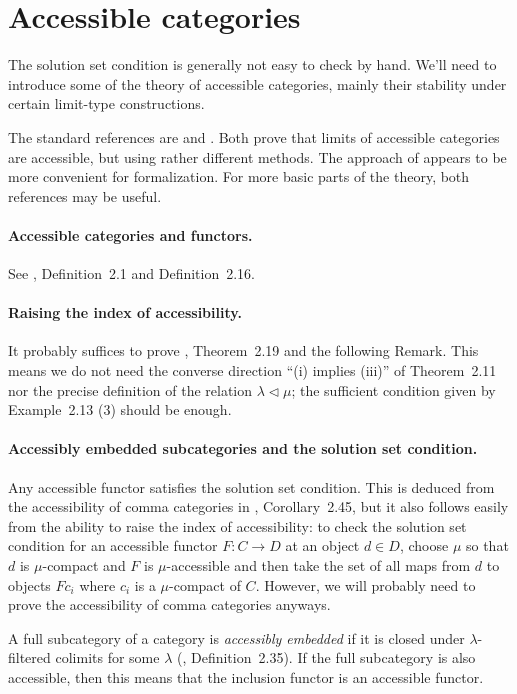 \documentclass{article}
\theoremstyle{definition}
\theoremstyle{plain}
\begin{document}
\section{Accessible categories}

The solution set condition is generally not easy to check by hand.
We'll need to introduce some of the theory of accessible categories, mainly their stability under certain limit-type constructions.

The standard references are \cite{MP} and \cite{AR}.
Both prove that limits of accessible categories are accessible, but using rather different methods.
The approach of \cite{AR} appears to be more convenient for formalization.
For more basic parts of the theory, both references may be useful.

\paragraph{Accessible categories and functors.}
See \cite{AR}, Definition~2.1 and Definition~2.16.

\paragraph{Raising the index of accessibility.}
It probably suffices to prove \cite{AR}, Theorem~2.19 and the following Remark.
This means we do not need the converse direction ``(i) implies (iii)'' of Theorem~2.11 nor the precise definition of the relation $\lambda \triangleleft \mu$; the sufficient condition given by Example~2.13 (3) should be enough.

\paragraph{Accessibly embedded subcategories and the solution set condition.}
Any accessible functor satisfies the solution set condition.
This is deduced from the accessibility of comma categories in \cite{AR}, Corollary~2.45, but it also follows easily from the ability to raise the index of accessibility: to check the solution set condition for an accessible functor $F : C \to D$ at an object $d \in D$, choose $\mu$ so that $d$ is $\mu$-compact and $F$ is $\mu$-accessible and then take the set of all maps from $d$ to objects $Fc_i$ where $c_i$ is a $\mu$-compact of $C$.
However, we will probably need to prove the accessibility of comma categories anyways.

A full subcategory of a category is \emph{accessibly embedded} if it is closed under $\lambda$-filtered colimits for some $\lambda$ (\cite{AR}, Definition~2.35).
If the full subcategory is also accessible, then this means that the inclusion functor is an accessible functor.
\end{document}
